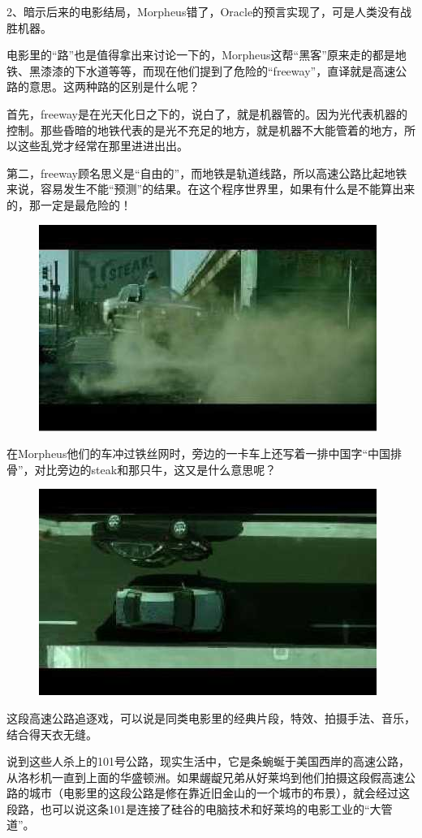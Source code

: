 \documentclass[UTF8]{ctexart}
\begin{document}
2、暗示后来的电影结局，Morpheus错了，Oracle的预言实现了，可是人类没有战胜机器。

电影里的“路”也是值得拿出来讨论一下的，Morpheus这帮“黑客”原来走的都是地铁、黑漆漆的下水道等等，而现在他们提到了危险的“freeway”，直译就是高速公路的意思。这两种路的区别是什么呢？

首先，freeway是在光天化日之下的，说白了，就是机器管的。因为光代表机器的控制。那些昏暗的地铁代表的是光不充足的地方，就是机器不大能管着的地方，所以这些乱党才经常在那里进进出出。

第二，freeway顾名思义是“自由的”，而地铁是轨道线路，所以高速公路比起地铁来说，容易发生不能“预测”的结果。在这个程序世界里，如果有什么是不能算出来的，那一定是最危险的！

\begin{figure}[htb]
\centering
\includegraphics[width=0.5\linewidth]{fig/read_reloaded-131}
\end{figure}

在Morpheus他们的车冲过铁丝网时，旁边的一卡车上还写着一排中国字“中国排骨”，对比旁边的steak和那只牛，这又是什么意思呢？

\begin{figure}[htb]
\centering
\includegraphics[width=0.5\linewidth]{fig/read_reloaded-132}
\end{figure}

这段高速公路追逐戏，可以说是同类电影里的经典片段，特效、拍摄手法、音乐，结合得天衣无缝。

说到这些人杀上的101号公路，现实生活中，它是条蜿蜒于美国西岸的高速公路，从洛杉机一直到上面的华盛顿洲。如果龌龊兄弟从好莱坞到他们拍摄这段假高速公路的城市（电影里的这段公路是修在靠近旧金山的一个城市的布景），就会经过这段路，也可以说这条101是连接了硅谷的电脑技术和好莱坞的电影工业的“大管道”。
\end{document}
